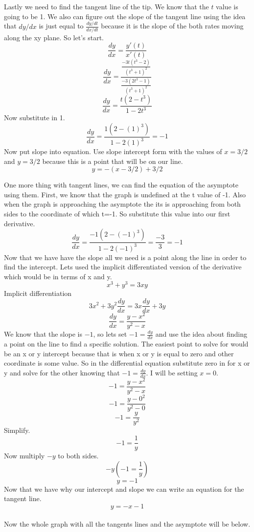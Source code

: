 \documentclass[a4paper,openright, 14pt]{article}
\begin{document}
Lastly we need to find the tangent line of the tip. We know that the $t$ value is going to be 1. We also can figure out the slope of the tangent line using the idea that $dy/dx$ is just equal to $\frac{dy/dt}{dx/dt}$ because it is the slope of the both rates moving along the xy plane. So let's start.
$$\frac{dy}{dx}=\frac{y'(t)}{x'(t)}$$
$$\frac{dy}{dx}=\frac{\frac{-3t(t^3 -2)}{(t^3 +1)^2}}{\frac{-3(2t^3 -1)}{(t^3 +1)^2}}$$
$$\frac{dy}{dx}=\frac{t(2-t^3)}{1-2t^3}$$
Now substitute in 1.
$$\frac{dy}{dx}=\frac{1(2-(1)^3)}{1-2(1)^3}=-1$$
Now put slope into equation. Use slope intercept form with the values of $x=3/2$ and $y=3/2$ because this is a point that will be on our line.
$$y=-(x-3/2)+3/2$$

One more thing with tangent lines, we can find the equation of the asymptote using them. First, we know that the graph is undefined at the t value of -1. Also when the graph is approaching the asymptote the its is approaching from both sides to the coordinate of which t=-1. So substitute this value into our first derivative.
$$\frac{dy}{dx}=\frac{-1(2-(-1)^3)}{1-2(-1)^3}=\frac{-3}{3}=-1$$
Now that we have have the slope all we need is a point along the line in order to find the intercept. Lets used the implicit differentiated version of the derivative which would be in terms of x and y.
$$x^3 + y^3=3xy$$
Implicit differentiation
$$3x^2+3y^2 \frac{dy}{dx} =3x\frac{dy}{dx} + 3y$$
$$\frac{dy}{dx}=\frac{y-x^2}{y^2 - x}$$
We know that the slope is $-1$, so lets set $-1=\frac{dy}{dx}$ and use the idea about finding a point on the line to find a specific solution. The easiest point to solve for would be an x or y intercept because that is when x or y is equal to zero and other coordinate is some value. So in the differential equation substitute zero in for x or y and solve for the other knowing that $-1=\frac{dy}{dx}$. I will be setting $x=0$.
$$-1=\frac{y-x^2}{y^2 - x}$$
$$-1=\frac{y-0^2}{y^2 - 0}$$
$$-1=\frac{y}{y^2}$$
Simplify.
$$-1=\frac{1}{y}$$
Now multiply $-y$ to both sides.
$$-y(-1=\frac{1}{y})$$
$$y=-1$$
Now that we have why our intercept and slope we can write an equation for the tangent line.
$$y=-x-1$$
\\
Now the whole graph with all the tangents lines and the asymptote will be below.\\
\end{document}
